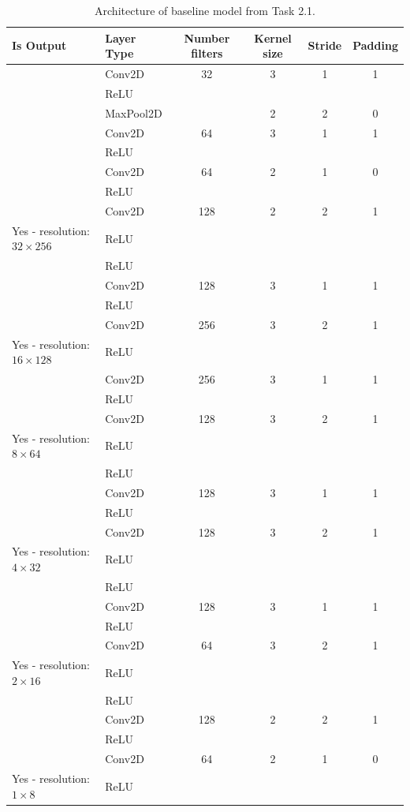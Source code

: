 \documentclass{article}
\begin{document}
\begin{table}[t!]
    \small
    \centering
    \begin{tabular}{l|l|c|c|c|c}
        \hline
         Is Output & Layer Type & Number filters & Kernel size & Stride & Padding  \\
         \hline
         & Conv2D & 32 & 3 & 1 & 1 \\
         & ReLU & & & & \\
         & MaxPool2D & & 2 & 2 & 0\\
         & Conv2D & 64 & 3 & 1 & 1\\
         & ReLU & & & & \\
         & Conv2D & 64 & 2 & 1 & 0 \\
         & ReLU & & & &  \\
         & Conv2D & 128 & 2 & 2 & 1\\
         Yes - resolution: $32\times 256$ & ReLU & & & & \\
         \hline
         & ReLU & & & &\\
         & Conv2D & 128 & 3 & 1 & 1\\
         & ReLU & & & & \\
         & Conv2D & 256 & 3 & 2 & 1\\
         Yes - resolution: $16\times 128$ & ReLU & & & & \\
         \hline
         & Conv2D & 256 & 3 & 1 & 1\\
         & ReLU & & & & \\
         & Conv2D & 128 & 3 & 2 & 1\\
         Yes - resolution: $8\times 64$ & ReLU & & & & \\
         \hline
         & ReLU & & & & \\
         & Conv2D & 128 & 3 & 1 & 1\\
         & ReLU & & & & \\
         & Conv2D & 128 & 3 & 2 & 1\\
         Yes - resolution: $4\times 32$ & ReLU & & & & \\
         \hline
         & ReLU & & & & \\
         & Conv2D & 128 & 3 & 1 & 1\\
         & ReLU & & & & \\
         & Conv2D & 64 & 3  & 2 & 1\\
         Yes - resolution: $2\times 16$ & ReLU & & &  & \\
         \hline
         & ReLU & & & & \\
         & Conv2D & 128 & 2 & 2 & 1\\
         & ReLU & & & & \\
         & Conv2D & 64 & 2 & 1 & 0\\
         Yes - resolution: $1\times 8$ & ReLU & & & &\\
         \hline
    \end{tabular}
    \caption{Architecture of baseline model from Task 2.1.}
    \label{tab:baseline}
\end{table}
\end{document}
